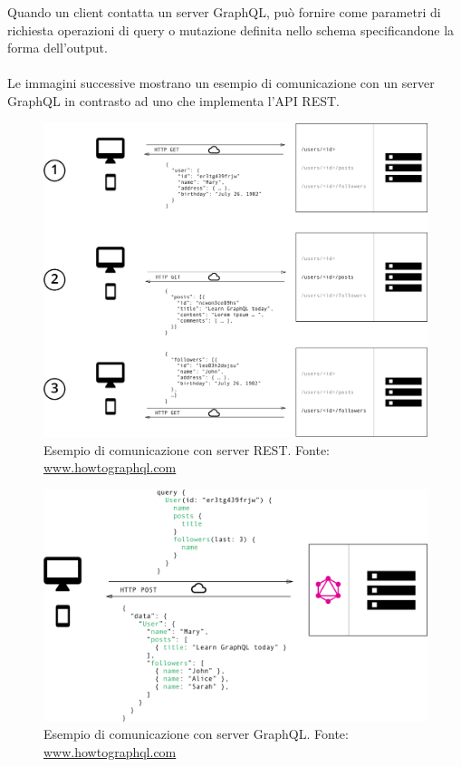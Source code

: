\documentclass[a4paper, 12pt]{report}
\begin{document}
      Quando un client contatta un server GraphQL, può fornire come parametri di richiesta operazioni di query o mutazione definita nello schema specificandone la forma dell'output.
      \paragraph*{}Le immagini successive mostrano un esempio di comunicazione con un server GraphQL in contrasto ad uno che implementa l'API REST.
      \begin{figure}[H]
        \includegraphics[width=\textwidth]{rest-communication.png}
        \caption{Esempio di comunicazione con server REST. Fonte: \href{https://www.howtoGraphQL.com/basics/1-GraphQL-is-the-better-rest/}{www.howtographql.com}}
      \end{figure}
      \begin{figure}[H]
        \includegraphics[width=\textwidth]{graphql-communication.png}
        \caption{Esempio di comunicazione con server GraphQL. Fonte: \href{https://www.howtoGraphQL.com/basics/1-GraphQL-is-the-better-rest/}{www.howtographql.com}}
      \end{figure}
\end{document}
